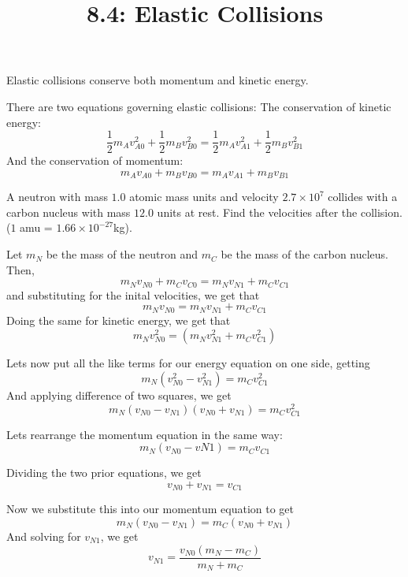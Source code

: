 \documentclass{article}
\title{8.4: Elastic Collisions}
\begin{document}
\maketitle
Elastic collisions conserve both momentum and kinetic energy.

\begin{proposition}
There are two equations governing elastic collisions: The conservation of kinetic energy: $$\frac{1}{2}m_Av_{A0}^2 + \frac{1}{2}m_Bv_{B0}^2 = \frac{1}{2}m_Av_{A1}^2 + \frac{1}{2}m_Bv_{B1}^2$$And the conservation of momentum:$$m_Av_{A0} + m_Bv_{B0} = m_Av_{A1} + m_Bv_{B1}$$
\end{proposition}

\begin{example}
A neutron with mass $1.0$ atomic mass units and velocity $2.7 \times 10^7$ collides with a carbon nucleus with mass $12.0$ units at rest. Find the velocities after the collision. ($1$ amu = $1.66 \times 10^{-27}$kg).
\end{example}

\begin{solution}
Let $m_N$ be the mass of the neutron and $m_C$ be the mass of the carbon nucleus. Then, $$m_Nv_{N0} + m_Cv_{C0} = m_Nv_{N1} + m_Cv_{C1}$$and substituting for the inital velocities, we get that $$m_Nv_{N0} = m_Nv_{N1} + m_Cv_{C1}$$Doing the same for kinetic energy, we get that $$m_Nv_{N0}^2 = (m_Nv_{N1}^2 + m_Cv_{C1}^2)$$

Lets now put all the like terms for our energy equation on one side, getting $$m_N(v_{N0}^2 - v_{N1}^2) = m_Cv_{C1}^2$$And applying difference of two squares, we get$$m_N(v_{N0}-v_{N1})(v_{N0}+v_{N1}) = m_Cv_{C1}^2$$

Lets rearrange the momentum equation in the same way:$$m_N(v_{N0}-v{N1}) = m_Cv_{C1}$$

Dividing the two prior equations, we get $$v_{N0} + v_{N1} = v_{C1}$$

Now we substitute this into our momentum equation to get $$m_N(v_{N0}- v_{N1}) = m_C(v_{N0} + v_{N1})$$And solving for $v_{N1}$, we get $$v_{N1} = \frac{v_{N0}(m_N - m_C)}{m_N+m_C}$$
\end{solution}
\end{document}
